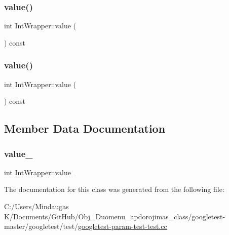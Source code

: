 \mbox{\label{class_int_wrapper_a6103e9dc5eb94678985e3c2ac481b508}} 
\subsubsection{\texorpdfstring{value()}{value()}\hspace{0.1cm}{\footnotesize\ttfamily [2/3]}}
{\footnotesize\ttfamily int Int\+Wrapper\+::value (\begin{DoxyParamCaption}{ }\end{DoxyParamCaption}) const\hspace{0.3cm}{\ttfamily [inline]}}

\mbox{\label{class_int_wrapper_a6103e9dc5eb94678985e3c2ac481b508}} 
\subsubsection{\texorpdfstring{value()}{value()}\hspace{0.1cm}{\footnotesize\ttfamily [3/3]}}
{\footnotesize\ttfamily int Int\+Wrapper\+::value (\begin{DoxyParamCaption}{ }\end{DoxyParamCaption}) const\hspace{0.3cm}{\ttfamily [inline]}}



\subsection{Member Data Documentation}
\mbox{\label{class_int_wrapper_a9695c22c2bcd5a7bc2775cf6e3a6e33a}} 
\subsubsection{\texorpdfstring{value\_}{value\_}}
{\footnotesize\ttfamily int Int\+Wrapper\+::value\+\_\+\hspace{0.3cm}{\ttfamily [private]}}



The documentation for this class was generated from the following file\+:\begin{DoxyCompactItemize}
\item 
C\+:/\+Users/\+Mindaugas K/\+Documents/\+Git\+Hub/\+Obj\+\_\+\+Duomenu\+\_\+apdorojimas\+\_\+class/googletest-\/master/googletest/test/\mbox{\hyperlink{googletest-master_2googletest_2test_2googletest-param-test-test_8cc}{googletest-\/param-\/test-\/test.\+cc}}\end{DoxyCompactItemize}
